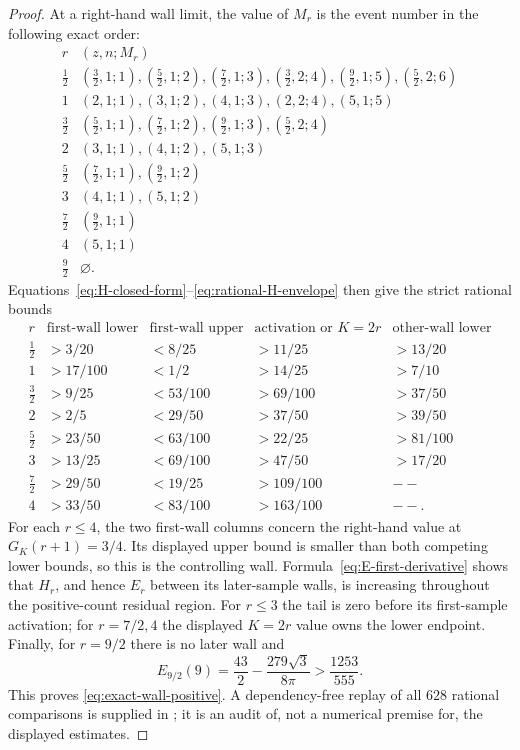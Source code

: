 \documentclass[11pt]{article}
\theoremstyle{remark}
\begin{document}
\begin{proof}
At a right-hand wall limit, the value of $M_r$ is the event number in
the following exact order:
\[
\begin{array}{c|l}
r&(z,n;M_r)\\ \hline
\frac12&(\frac32,1;1),(\frac52,1;2),(\frac72,1;3),
(\frac32,2;4),(\frac92,1;5),(\frac52,2;6)\\
1&(2,1;1),(3,1;2),(4,1;3),(2,2;4),(5,1;5)\\
\frac32&(\frac52,1;1),(\frac72,1;2),(\frac92,1;3),(\frac52,2;4)\\
2&(3,1;1),(4,1;2),(5,1;3)\\
\frac52&(\frac72,1;1),(\frac92,1;2)\\
3&(4,1;1),(5,1;2)\\
\frac72&(\frac92,1;1)\\
4&(5,1;1)\\
\frac92&\varnothing.
\end{array}
\]
Equations~\eqref{eq:H-closed-form}--\eqref{eq:rational-H-envelope}
then give the strict rational bounds
\[
\begin{array}{c|c|c|c|c}
r&\text{first-wall lower}&\text{first-wall upper}
 &\text{activation or }K=2r&\text{other-wall lower}\\ \hline
\frac12&>3/20&<8/25&>11/25&>13/20\\
1&>17/100&<1/2&>14/25&>7/10\\
\frac32&>9/25&<53/100&>69/100&>37/50\\
2&>2/5&<29/50&>37/50&>39/50\\
\frac52&>23/50&<63/100&>22/25&>81/100\\
3&>13/25&<69/100&>47/50&>17/20\\
\frac72&>29/50&<19/25&>109/100&--\\
4&>33/50&<83/100&>163/100&--.
\end{array}
\]
For each $r\leq4$, the two first-wall columns concern the right-hand value
at $G_K(r+1)=3/4$.  Its displayed upper bound is smaller than both
competing lower bounds, so this is the controlling wall.
Formula~\eqref{eq:E-first-derivative} shows that $H_r$, and hence $E_r$
between its later-sample walls, is increasing throughout the
positive-count residual region.  For $r\leq3$ the tail is zero before its
first-sample activation; for $r=7/2,4$ the displayed $K=2r$ value owns the
lower endpoint.  Finally, for $r=9/2$ there is no later wall and
\[
 E_{9/2}(9)=\frac{43}{2}-\frac{279\sqrt3}{8\pi}
 >\frac{1253}{555}.
\]
This proves \eqref{eq:exact-wall-positive}.  A dependency-free replay of
all $628$ rational comparisons is supplied in
; it is an audit of,
not a numerical premise for, the displayed estimates.
\end{proof}
\end{document}
